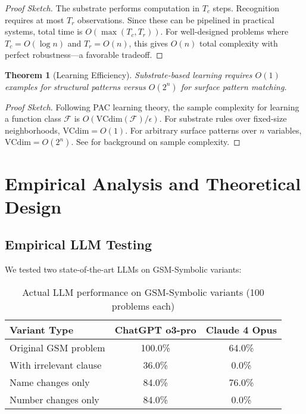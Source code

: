 \documentclass[11pt,letterpaper]{article}
\theoremstyle{plain}
\newtheorem{theorem}{Theorem}
\theoremstyle{definition}
\theoremstyle{remark}
\begin{document}
\begin{proof}[Proof Sketch]
The substrate performs computation in $T_c$ steps. Recognition requires at most $T_r$ observations. Since these can be pipelined in practical systems, total time is $O(\max(T_c, T_r))$. For well-designed problems where $T_c = O(\log n)$ and $T_r = O(n)$, this gives $O(n)$ total complexity with perfect robustness—a favorable tradeoff.
\end{proof}

\begin{theorem}[Learning Efficiency]
Substrate-based learning requires $O(1)$ examples for structural patterns versus $O(2^n)$ for surface pattern matching.
\end{theorem}

\begin{proof}[Proof Sketch]
Following PAC learning theory, the sample complexity for learning a function class $\mathcal{F}$ is $O(\text{VCdim}(\mathcal{F})/\epsilon)$. For substrate rules over fixed-size neighborhoods, $\text{VCdim} = O(1)$. For arbitrary surface patterns over $n$ variables, $\text{VCdim} = O(2^n)$. See \cite{arora2009computational} for background on sample complexity.
\end{proof}

\section{Empirical Analysis and Theoretical Design}
\label{sec:analysis}

\subsection{Empirical LLM Testing}

We tested two state-of-the-art LLMs on GSM-Symbolic variants:

\begin{table}[h]
\centering
\caption{Actual LLM performance on GSM-Symbolic variants (100 problems each)}
\begin{tabular}{lcc}
\toprule
\textbf{Variant Type} & \textbf{ChatGPT o3-pro} & \textbf{Claude 4 Opus} \\
\midrule
Original GSM problem & 100.0\% & 64.0\% \\
With irrelevant clause & 36.0\% & 0.0\% \\
Name changes only & 84.0\% & 76.0\% \\
Number changes only & 84.0\% & 0.0\% \\
\bottomrule
\end{tabular}
\end{table}
\end{document}
